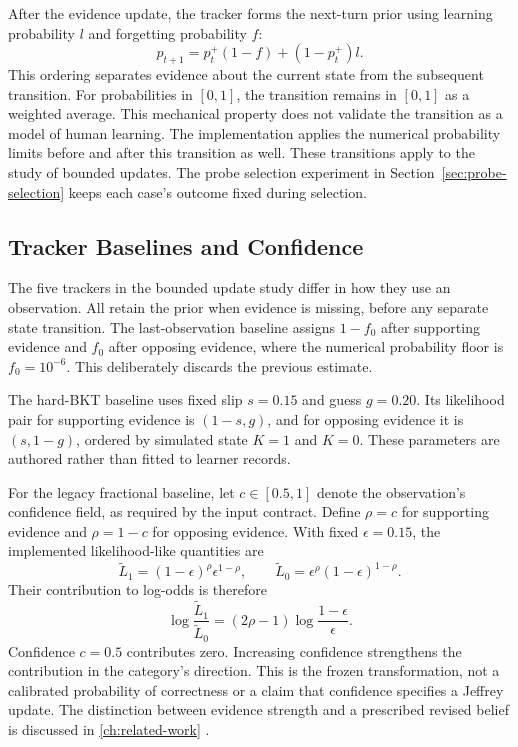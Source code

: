 After the evidence update, the tracker forms the next-turn prior using learning probability $l$ and forgetting probability $f$:
\begin{equation}
 p_{t+1}=p_t^+(1-f)+(1-p_t^+)l.
\end{equation}
This ordering separates evidence about the current state from the subsequent transition. For probabilities in $[0,1]$, the
transition remains in $[0,1]$ as a weighted average. This mechanical property does not validate the transition as a model of
human learning. The implementation applies the numerical probability limits before and after this transition as well.
These transitions apply to the study of bounded updates. The probe selection experiment in
Section~\ref{sec:probe-selection} keeps each case's outcome fixed during selection.

\subsection{Tracker Baselines and Confidence}

The five trackers in the bounded update study differ in how they use an observation. All retain the prior when evidence is missing, before any separate
state transition. The last-observation baseline assigns $1-f_0$ after supporting evidence and $f_0$ after opposing evidence,
where the numerical probability floor is $f_0=10^{-6}$. This deliberately discards the previous estimate.

The hard-BKT baseline uses fixed slip $s=0.15$ and guess $g=0.20$. Its likelihood pair for supporting evidence is
$(1-s,g)$, and for opposing evidence it is $(s,1-g)$, ordered by simulated state $K=1$ and $K=0$.
These parameters are authored rather than fitted to learner records.

For the legacy fractional baseline, let $c\in[0.5,1]$ denote the observation's confidence field, as required by the input contract.
Define $\rho=c$ for supporting
evidence and $\rho=1-c$ for opposing evidence. With fixed $\epsilon=0.15$, the implemented likelihood-like quantities are
\begin{equation}
 \widetilde L_1=(1-\epsilon)^\rho\epsilon^{1-\rho},\qquad
 \widetilde L_0=\epsilon^\rho(1-\epsilon)^{1-\rho}.
\end{equation}
Their contribution to log-odds is therefore
\begin{equation}
 \log\frac{\widetilde L_1}{\widetilde L_0}
 =(2\rho-1)\log\frac{1-\epsilon}{\epsilon}.
\end{equation}
Confidence $c=0.5$ contributes zero. Increasing confidence strengthens the contribution in the category's direction.
This is the frozen transformation, not a calibrated probability of correctness or a claim that confidence specifies a
Jeffrey update. The distinction between evidence strength and a prescribed revised belief is discussed in
\cref{ch:related-work} \parencite{chan2003uncertain}.

